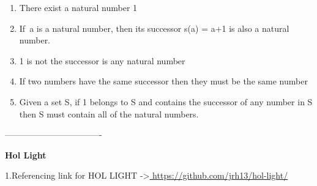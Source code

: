 \documentclass[12pt]{article}
\renewcommand{\_}{\kern-1.5pt\textunderscore\kern-1.5pt}
\begin{document}
\begin{enumerate}
	\item There exist a natural number 1\par

	\item If\ a is a natural number, then its successor  s(a) = a+1 is also a natural number.\par

	\item 1 is not the successor is any natural number\par

	\item If two numbers have the same successor then they must be the same number\par

	\item Given a set S, if 1 belongs to S and contains the successor of any number in S then S must contain all of the natural numbers.
\end{enumerate}\par


\vspace{\baselineskip}

\vspace{\baselineskip}

\vspace{\baselineskip}

\vspace{\baselineskip}
\begin{FlushLeft}
----------------------------------
\end{FlushLeft}\par


\vspace{\baselineskip}
\begin{FlushLeft}
{\fontsize{14pt}{16.8pt}\selectfont \textbf{Hol Light}\par}
\end{FlushLeft}\par


\vspace{\baselineskip}
\begin{FlushLeft}
{\fontsize{14pt}{16.8pt}\selectfont \tab  \tab  \tab  \tab  \tab \par}
\end{FlushLeft}\par

1.Referencing link for HOL LIGHT ->\href{https://github.com/jrh13/hol-light/}{ }\href{https://github.com/jrh13/hol-light/}{\textcolor[HTML]{0000E9}{\ul{https://github.com/jrh13/hol-light/}}}\par
\end{document}
